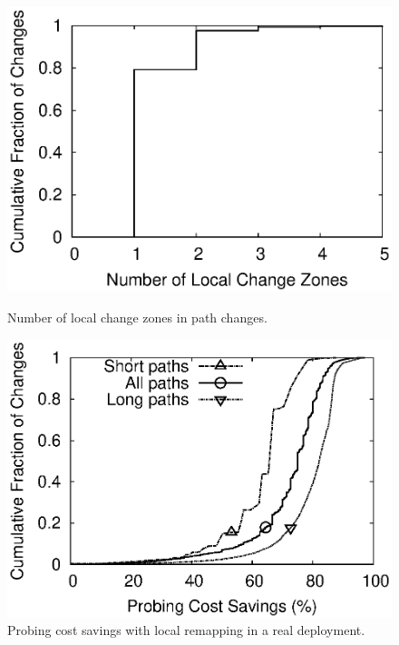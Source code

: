 \begin{figure}
\vspace{5mm}
\begin{minipage}{0.33\textwidth}
\includegraphics[width=1.05\textwidth]{figs/ndisjoint.eps}
\caption{Number of local change zones in path changes.}
\label{fig:sim.ndisjoint}
\end{minipage}
\hfill
\begin{minipage}{0.33\textwidth}
\includegraphics[width=1.05\textwidth]{figs/probsavingsreal.eps}
\caption{Probing cost savings with local remapping in a real
deployment.}
\label{fig:deploy.savings}
\end{minipage}
\begin{minipage}{0.33\textwidth}

\end{minipage}
\end{figure}
